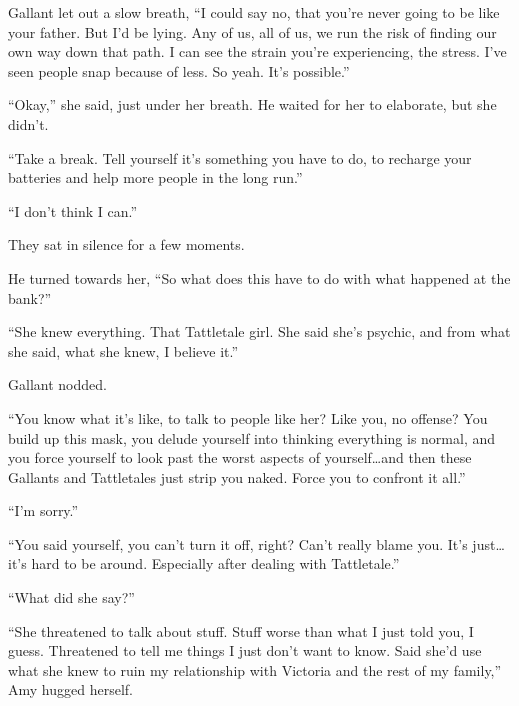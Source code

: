 Gallant let out a slow breath, ``I could say no, that you're never going to be like your father.  But I'd be lying.  Any of us, all of us, we run the risk of finding our own way down that path.  I can see the strain you're experiencing, the stress.  I've seen people snap because of less.  So yeah.  It's possible.''



``Okay,'' she said, just under her breath.  He waited for her to elaborate, but she didn't.



``Take a break.  Tell yourself it's something you have to do, to recharge your batteries and help more people in the long run.''



``I don't think I can.''



They sat in silence for a few moments.



He turned towards her, ``So what does this have to do with what happened at the bank?''



``She knew everything.  That Tattletale girl.  She said she's psychic, and from what she said, what she knew, I believe it.''



Gallant nodded.



``You know what it's like, to talk to people like her?  Like you, no offense?  You build up this mask, you delude yourself into thinking everything is normal, and you force yourself to look past the worst aspects of yourself\ldots and then these Gallants and Tattletales just strip you naked.  Force you to confront it all.''



``I'm sorry.''



``You said yourself, you can't turn it off, right?  Can't really blame you.  It's just\ldots it's hard to be around.  Especially after dealing with Tattletale.''



``What did she say?''



``She threatened to talk about stuff.  Stuff worse than what I just told you, I guess.  Threatened to tell me things I just don't want to know.  Said she'd use what she knew to ruin my relationship with Victoria and the rest of my family,'' Amy hugged herself.




